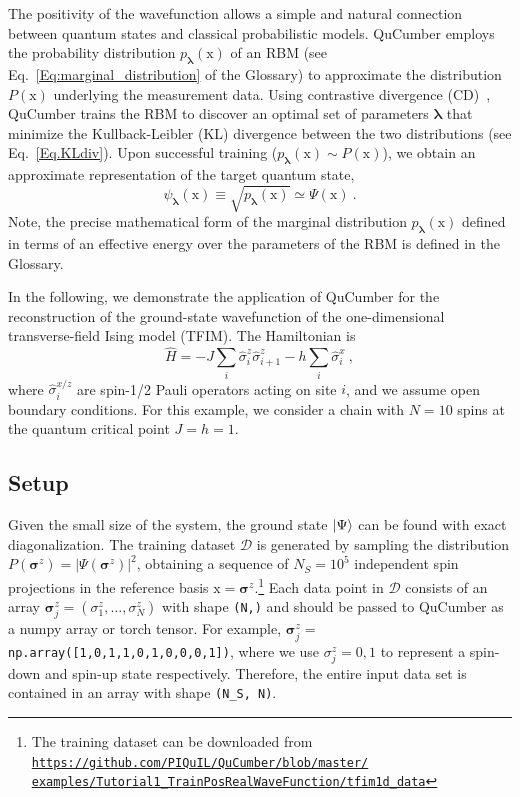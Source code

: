 \documentclass[submission, Phys, hidelnks]{SciPost}
\newcommand{\x}{\bm{\mathrm{x}}}
\begin{document}
The positivity of the wavefunction allows a simple and natural connection
between quantum states and classical probabilistic models. QuCumber employs the
probability distribution $p_{\bm{\lambda}}(\x)$ of an RBM (see Eq.~\ref{Eq:marginal_distribution} of the Glossary)
to approximate the
distribution $P(\x)$ underlying the measurement data. Using contrastive
divergence (CD)~\cite{hinton_training_2002}, QuCumber trains the RBM to discover
an optimal set of parameters ${\bm \lambda}$ that minimize the Kullback-Leibler (KL) divergence
between the two distributions (see Eq.~\ref{Eq.KLdiv}). Upon successful training
($p_{\bm{\lambda}}(\x)\sim P(\x)$), we obtain an approximate representation of
the target quantum state,
\begin{equation}\label{wfpd}
    \psi_{\bm{\lambda}}(\x) \equiv \sqrt{p_{\bm{\lambda}}(\x)}
    \simeq\Psi(\x)\:.
\end{equation}
Note, the precise mathematical form of the marginal distribution $p_{\bm{\lambda}}(\x)$ defined in terms of an effective energy
over the parameters of the RBM is defined in the Glossary.

In the following, we demonstrate the application of QuCumber for the reconstruction of the
ground-state wavefunction of the one-dimensional transverse-field Ising model
(TFIM). The Hamiltonian is
\begin{equation}
    \hat{H} = -J\sum_i \hat{\sigma}^z_i \hat{\sigma}^z_{i+1} - h \sum_i\hat{\sigma}^x_i\:, \label{TFIM}
\end{equation}
where $\hat{\sigma}^{x/z}_i$ are spin-1/2 Pauli operators acting on site $i$,
and we assume open boundary conditions. For this example, we consider a chain
with $N=10$ spins at the quantum critical point $J=h=1$.

\subsection{Setup}\label{subsec:example}
Given the small size of the system, the ground state $\ket{ \Psi}$ can be found
with exact diagonalization. The training dataset $\mathcal{D}$ is generated by
sampling the distribution $P(\bm{\sigma}^z)=|\Psi(\bm{\sigma}^z)|^2$, obtaining
a sequence of $N_S=10^5$ independent spin projections in the reference basis
$\x = \bm{\sigma}^z$.\footnote{
        The training dataset can be downloaded from
        \href{https://github.com/PIQuIL/QuCumber/blob/master/examples/Tutorial1_TrainPosRealWaveFunction/tfim1d_data.txt}{\texttt{https://github.com/PIQuIL/QuCumber/blob/master/\\examples/Tutorial1\_TrainPosRealWaveFunction/tfim1d\_data}}
    }
Each data point in $\mathcal{D}$ consists of an array $\bm{\sigma}^z_j=(\sigma^z_1,\dots,\sigma^z_N)$ with shape \verb|(N,)| and should be passed to QuCumber as a numpy array or torch tensor. For example, $\bm{\sigma}^z_j=$ \verb|np.array([1,0,1,1,0,1,0,0,0,1])|, where we use $\sigma_j^z=0,1$ to represent a spin-down and spin-up state respectively. Therefore, the entire input data set is contained in an array with shape \verb|(N_S, N)|.
\end{document}
